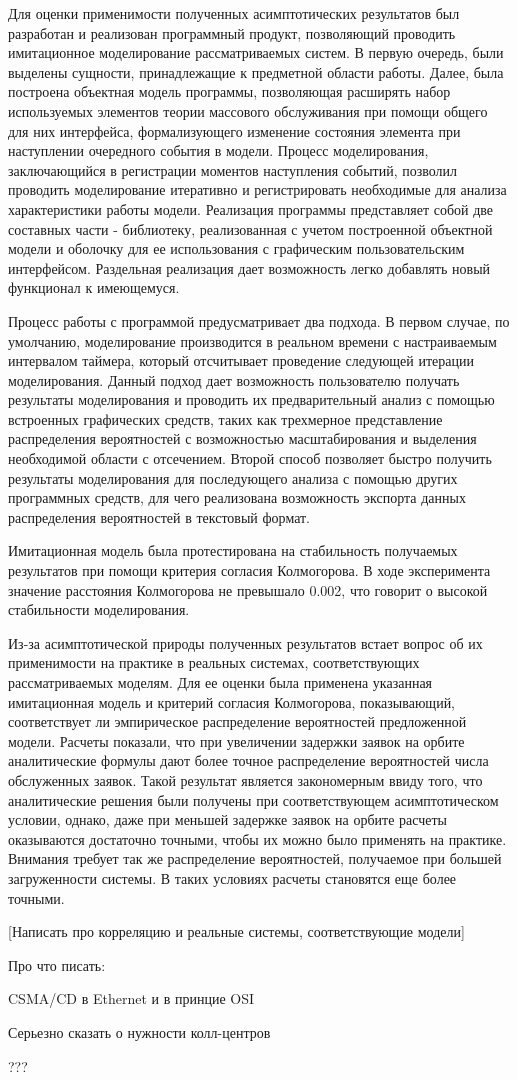 Для оценки применимости полученных асимптотических результатов был разработан и реализован программный продукт, позволяющий проводить имитационное моделирование рассматриваемых систем. В первую очередь, были выделены сущности, принадлежащие к предметной области работы. Далее, была построена объектная модель программы, позволяющая расширять набор используемых элементов теории массового обслуживания при помощи общего для них интерфейса, формализующего изменение состояния элемента при наступлении очередного события в модели. Процесс моделирования, заключающийся в регистрации моментов наступления событий, позволил проводить моделирование итеративно и регистрировать необходимые для анализа характеристики работы модели. Реализация программы представляет собой две составных части - библиотеку, реализованная с учетом построенной объектной модели и оболочку для ее использования с графическим пользовательским интерфейсом. Раздельная реализация дает возможность легко добавлять новый функционал к имеющемуся.  

Процесс работы с программой предусматривает два подхода. В первом случае, по умолчанию, моделирование производится в реальном времени с настраиваемым интервалом таймера, который отсчитывает проведение следующей итерации моделирования. Данный подход дает возможность пользователю получать результаты моделирования и проводить их предварительный анализ с помощью встроенных графических средств, таких как трехмерное представление распределения вероятностей с возможностью масштабирования и выделения необходимой области с отсечением. Второй способ позволяет быстро получить результаты моделирования для последующего анализа с помощью других программных средств, для чего реализована возможность экспорта данных распределения вероятностей в текстовый формат. 

Имитационная модель была протестирована на стабильность получаемых результатов при помощи критерия согласия Колмогорова. В ходе эксперимента значение расстояния Колмогорова не превышало 0.002, что говорит о высокой стабильности моделирования.

Из-за асимптотической природы полученных результатов встает вопрос об их применимости на практике в реальных системах, соответствующих рассматриваемых моделям. Для ее оценки была применена указанная имитационная модель и критерий согласия Колмогорова, показывающий, соответствует ли эмпирическое распределение вероятностей предложенной модели. Расчеты показали, что при увеличении задержки заявок на орбите аналитические формулы дают более точное распределение вероятностей числа обслуженных заявок. Такой результат является закономерным ввиду того, что аналитические решения были получены при соответствующем асимптотическом условии, однако, даже при меньшей задержке заявок на орбите расчеты оказываются достаточно точными, чтобы их можно было применять на практике. Внимания требует так же распределение вероятностей, получаемое при большей загруженности системы. В таких условиях расчеты становятся еще более точными.

[Написать про корреляцию и реальные системы, соответствующие модели]

Про что писать:

CSMA/CD в Ethernet и в принцие OSI

Серьезно сказать о нужности колл-центров

???
 \clearpage